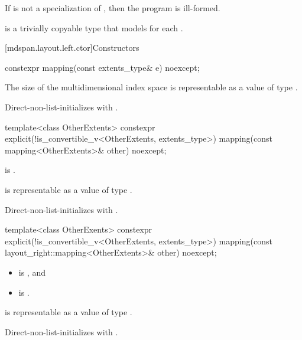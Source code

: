\pnum
If  is not a specialization of ,
then the program is ill-formed.

\pnum
{} is a trivially copyable type
that models  for each .

[mdspan.layout.left.ctor]{Constructors}

%
\begin{itemdecl}
constexpr mapping(const extents_type& e) noexcept;
\end{itemdecl}

\begin{itemdescr}
\pnum
\expects
The size of the multidimensional index space 
is representable as a value of type .

\pnum
\effects
Direct-non-list-initializes  with .
\end{itemdescr}

%
\begin{itemdecl}
template<class OtherExtents>
  constexpr explicit(!is_convertible_v<OtherExtents, extents_type>)
    mapping(const mapping<OtherExtents>& other) noexcept;
\end{itemdecl}

\begin{itemdescr}
\pnum
\constraints
{} is .

\pnum
\expects
{} is representable as
a value of type .

\pnum
\effects
Direct-non-list-initializes  with .
\end{itemdescr}

%
\begin{itemdecl}
template<class OtherExents>
  constexpr explicit(!is_convertible_v<OtherExtents, extents_type>)
    mapping(const layout_right::mapping<OtherExtents>& other) noexcept;
\end{itemdecl}

\begin{itemdescr}
\pnum
\constraints
\begin{itemize}
\item
{} is , and
\item
{} is .
\end{itemize}

\pnum
\expects
{} is representable as
a value of type .

\pnum
\effects
Direct-non-list-initializes  with .
\end{itemdescr}

